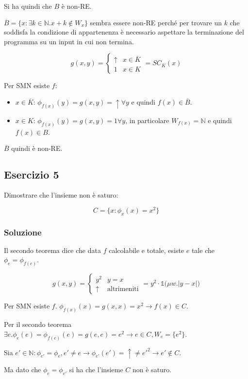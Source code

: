 Si ha quindi che $B$ è non-RE.

$\overline{B} = \{ x : \exists k \in \mathbb{N} . x + k \notin W_x \}$ sembra essere non-RE perché per trovare un $k$ che soddisfa la condizione di appartenenza è necessario aspettare la terminazione del programma su un input in cui non termina.

$$
g(x,y) = \begin{cases}
\uparrow & x \in \overline{K} \\
1 & x \in K
\end{cases} = SC_K(x)
$$

Per SMN esiste $f$:

\begin{itemize}
	\item $x \in \overline{K}$: $\phi_{f(x)}(y) = g(x,y) = \uparrow \forall y$ e quindi $f(x) \in \overline{B}$.
	\item $x \in K$: $\phi_{f(x)}(y) = g(x,y) = 1 \forall y$, in particolare $W_{f(x)} = \mathbb{N}$ e quindi $f(x) \in B$.
\end{itemize}

$\overline{B}$ quindi è non-RE.

\subsection{Esercizio 5}

Dimostrare che l'insieme non è saturo:

$$
C = \{ x : \phi_x(x) = x^2 \}
$$

\subsubsection{Soluzione}

Il secondo teorema dice che data $f$ calcolabile e totale, esiste $e$ tale che $\phi_e = \phi_{f(e)}$.

$$
g(x,y) = \begin{cases}
y^2 &y = x \\
\uparrow &\text{altrimeniti}
\end{cases} = y^2 \cdot \mathbb{1}\Big( \mu w . |y - x|\Big)
$$ 

Per SMN esiste $f$. $\phi_{f(x)}(x) = g(x,x) = x^2 \rightarrow f(x) \in C$. 

Per il secondo teorema $\exists e . \phi_e(e) = \phi_{f(e)}(e)= g(e,e) = e^2 \rightarrow e \in C, W_e = \{e^2\}$. 

Sia $e' \in \mathbb{N} : \phi_{e'} = \phi_e, e' \neq e \rightarrow \phi_{e'}(e') = \uparrow \neq e'^2 \rightarrow e' \notin C$.

Ma dato che $\phi_e = \phi_{e'}$ si ha che l'insieme $C$ non è saturo.